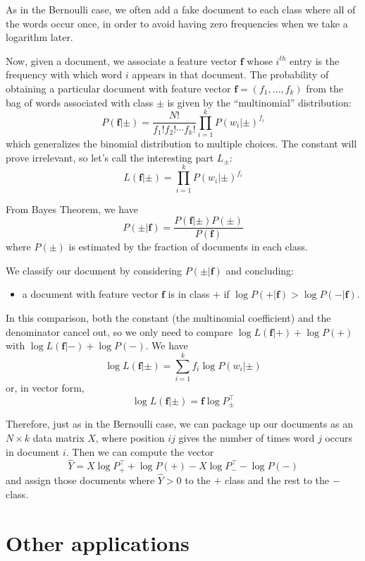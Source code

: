 \documentclass[
  11pt,
  letterpaper,
]{scrbook}
\providecommand{\tightlist}{%
  \setlength{\itemsep}{0pt}\setlength{\parskip}{0pt}}\usepackage{longtable,booktabs,array}
\theoremstyle{plain}
\theoremstyle{remark}
\begin{document}
As in the Bernoulli case, we often add a fake document to each class
where all of the words occur once, in order to avoid having zero
frequencies when we take a logarithm later.

Now, given a document, we associate a feature vector \(\mathbf{f}\)
whose \(i^{th}\) entry is the frequency with which word \(i\) appears in
that document. The probability of obtaining a particular document with
feature vector \(\mathbf{f}=(f_1,\ldots, f_k)\) from the bag of words
associated with class \(\pm\) is given by the ``multinomial''
distribution: \[
P(\mathbf{f}|\pm)=\frac{N!}{f_1!f_2!\cdots f_k!} \prod_{i=1}^{k} P(w_{i}|\pm)^{f_{i}}
\] which generalizes the binomial distribution to multiple choices. The
constant will prove irrelevant, so let's call the interesting part
\(L_{\pm}\): \[
L(\mathbf{f}|\pm)= \prod_{i=1}^{k} P(w_{i}|\pm)^{f_{i}}
\]

From Bayes Theorem, we have \[
P(\pm|\mathbf{f}) = \frac{P(\mathbf{f}|\pm)P(\pm)}{P(\mathbf{f})}
\] where \(P(\pm)\) is estimated by the fraction of documents in each
class.

We classify our document by considering \(P(\pm|\mathbf{f})\) and
concluding:

\begin{itemize}
\tightlist
\item
  a document with feature vector \(\mathbf{f}\) is in class \(+\) if
  \(\log P(+|\mathbf{f})>\log P(-|\mathbf{f})\).
\end{itemize}

In this comparison, both the constant (the multinomial coefficient) and
the denominator cancel out, so we only need to compare
\(\log L(\mathbf{f}|+)+\log P(+)\) with
\(\log L(\mathbf{f}|-)+\log P(-)\). We have \[
\log L(\mathbf{f}|\pm) = \sum_{i=1}^{k} f_{i}\log P(w_{i}|\pm)
\] or, in vector form, \[
\log L(\mathbf{f}|\pm) = \mathbf{f}\log P_{\pm}^{\intercal}
\]

Therefore, just as in the Bernoulli case, we can package up our
documents as an \(N\times k\) data matrix \(X\), where position \(ij\)
gives the number of times word \(j\) occurs in document \(i\). Then we
can compute the vector \[
\hat{Y} = X\log P_{+}^{\intercal} + \log P(+)-X\log P_{-}^{\intercal} - \log P(-)
\] and assign those documents where \(\hat{Y}>0\) to the \(+\) class and
the rest to the \(-\) class.

\hypertarget{other-applications}{%
\section{Other applications}\label{other-applications}}
\end{document}
